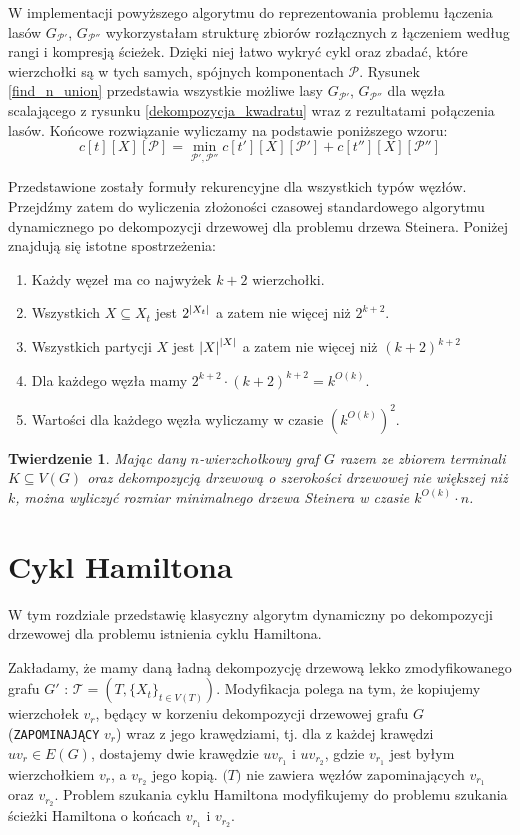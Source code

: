 \documentclass[12pt, oneside]{report}
\newtheorem{theorem}{Twierdzenie}
\newcommand\Omicron{O}
\begin{document}
W implementacji powyższego algorytmu do reprezentowania problemu łączenia lasów $G_{\mathcal{P}'}$, $G_{\mathcal{P}''}$ wykorzystałam strukturę zbiorów rozłącznych z łączeniem według rangi i kompresją ścieżek. Dzięki niej łatwo wykryć cykl oraz zbadać, które wierzchołki są w tych samych, spójnych komponentach $\mathcal{P}$. Rysunek \ref{find_n_union} przedstawia wszystkie możliwe lasy $G_{\mathcal{P}'}$, $G_{\mathcal{P}''}$ dla węzła scalającego z rysunku \ref{dekompozycja_kwadratu} wraz z rezultatami połączenia lasów.
Końcowe rozwiązanie wyliczamy na podstawie poniższego wzoru:
$$c[t][X][\mathcal{P}] = \min \limits_{\mathcal{P}', \mathcal{P}''} c[t'][X][\mathcal{P}'] + c[t''][X][\mathcal{P}'']$$

Przedstawione zostały formuły rekurencyjne dla wszystkich typów węzłów. Przejdźmy zatem do wyliczenia złożoności czasowej standardowego algorytmu dynamicznego po dekompozycji drzewowej dla problemu drzewa Steinera. Poniżej znajdują się istotne spostrzeżenia:
\begin{enumerate}[label=(\alph*)]
\item Każdy węzeł ma co najwyżek $k+2$ wierzchołki.
\item Wszystkich $X \subseteq X_t$ jest $2^{\abs{X_t}}$ a zatem nie więcej niż $2^{k+2}$.
\item Wszystkich partycji $X$ jest $\abs{X}^{\abs{X}}$ a zatem nie więcej niż $(k+2)^{k+2}$
\item Dla każdego węzła mamy $2^{k+2} \cdot (k+2)^{k+2} = k^{\Omicron(k)}$.
\item Wartości dla każdego węzła wyliczamy w czasie $(k^{\Omicron(k)})^2$.
\end{enumerate}
 
\begin{theorem}
Mając dany $n$-wierzchołkowy graf $G$ razem ze zbiorem terminali $K \subseteq V(G)$ oraz dekompozycją drzewową o szerokości drzewowej nie większej niż $k$, można wyliczyć rozmiar minimalnego drzewa Steinera w czasie $k^{\Omicron(k)} \cdot n$. 
\end{theorem}

    	\section{Cykl Hamiltona}
    	
W tym rozdziale przedstawię klasyczny algorytm dynamiczny po dekompozycji drzewowej dla problemu istnienia cyklu Hamiltona. 

Zakładamy, że mamy daną ładną dekompozycję drzewową lekko zmodyfikowanego grafu $G'$ : $\mathcal{T} = (T, \{X_t\}_{t \in V(T)})$. Modyfikacja polega na tym, że kopiujemy wierzchołek $v_r$, będący w korzeniu dekompozycji drzewowej grafu $G$ (\texttt{ZAPOMINAJĄCY} $v_r$) wraz z jego krawędziami, tj. dla z każdej krawędzi $uv_r \in E(G)$, dostajemy dwie krawędzie $uv_{r_1}$ i $uv_{r_2}$, gdzie $v_{r_1}$ jest byłym wierzchołkiem $v_r$, a $v_{r_2}$ jego kopią. $\mathcal(T)$ nie zawiera węzłów zapominających $v_{r_1}$ oraz $v_{r_2}$. Problem szukania cyklu Hamiltona modyfikujemy do problemu szukania ścieżki Hamiltona o końcach $v_{r_1}$ i $v_{r_2}$.
\end{document}
